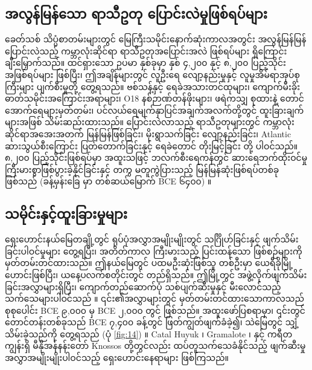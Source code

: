 \documentclass[10pt,twocolumn,letterpaper]{article}
\begin{document}
\subsection{အလွန်မြန်သော ရာသီဥတု ပြောင်းလဲမှုဖြစ်ရပ်များ}

ခေတ်သစ် သိပ္ပံစာတမ်းများတွင် မြေကြီးသမိုင်းနောက်ဆုံးကာလအတွင်း အလွန်မြန်မြန် ပြောင်းလဲသည့် ကမ္ဘာလုံးဆိုင်ရာ ရာသီဥတုအပြောင်းအလဲ ဖြစ်ရပ်များ ရှိကြောင်း ချီးမြှောက်သည်။ ထင်ရှားသော ဥပမာ နှစ်ခုမှာ နှစ် ၄,၂၀၀ နှင့် ၈,၂၀၀ ပြည့်သိုင်း အဖြစ်ရပ်များ ဖြစ်ပြီး၊ ဤအချိန်များတွင် လူဦးရေ လျော့နည်းမှုနှင့် လူမှုအိမ်ရာအုပ်စုကြီးများ ပျက်စီးမှုတို့ တွေ့ရသည်။ ဗစ်သန့်နှင့် ရေခဲအသားတင်ထုများ၊ ကျောက်မီးခိုးဓာတ်သမိုင်းအကြောင်းအရာများ၊ O18 နစ်ဉာဏ်တန်ဖိုးများ၊ ဖရဲကသျှ စုထားနဲ့ တောင်အောက်ရေများမှတ်တမ်း၊ ပင်လယ်ရေမျက်နှာပြင်အချက်အလက်တို့တွင် ထူးခြားချက်များအဖြစ် သိမ်းဆည်းထားသည်။ ပြောင်းလဲလာသည့် ရာသီဥတုများတွင် ကမ္ဘာလုံးဆိုင်ရာအအေးအတက် မြန်မြန်ဖြစ်ခြင်း၊ မိုးရွာသက်ခြင်း လျော့နည်းခြင်း၊ Atlantic ဆားသွယ်စီးကြောင်း ပြတ်တောက်ခြင်းနှင့် ရေခဲတောင် တိုးမြင့်ခြင်း \cite{90,91,92} တို့ ပါဝင်သည်။ ၈,၂၀၀ ပြည့်သိုင်းဖြစ်ရပ်မှာ အထူးသဖြင့် ဘလက်စီးရေကန်တွင် ဆားရေဘက်ထိုးဝင်မှု ကြီးမားစွာဖြစ်ပွားခဲ့နိုင်ခြင်းနှင့် တကွ မတူကွဲပြားသည့် မြန်မြန်ဆုံးဖြစ်ရပ်တစ်ခုဖြစ်သည် (ခန့်မှန်းခြေ မှာ တစ်ဆယ်မြောက် BCE ၆၄၀၀) \cite{93}။

\subsection{သမိုင်းနှင့်ထူးခြားမှုများ}

ရှေးဟောင်းနယ်မြေတချို့တွင် ရုပ်ပုံအလွှာအမျိုးမျိုးတွင် သင်္ဂြိုဟ်ခြင်းနှင့် ဖျက်သိမ်းခြင်းပါဝင်မှုများ တွေ့ရပြီး၊ အတိတ်ကာလ ကြီးမားသည့် ပြင်းထန်သော ဖြစ်စဉ်များကို မှတ်တမ်းတင်ထားသည်။ ဤနယ်မြေတွင် ပထမဦးဆုံးဖြစ်သူ တစ်ဦးမှာ ယေရီခိုမြို့ဟောင်းဖြစ်ပြီး၊ ယနေ့ပလက်စတိုင်းတွင် တည်ရှိသည်။ ဤမြို့တွင် အဖွဲ့လိုက်ဖျက်သိမ်းခြင်းအလွှာများရှိပြီး၊ ကျောက်တည်ဆောက်ပုံ သစ်ပျက်ဆီးမှုနှင့် မီးလောင်သည့်သက်သေများပါဝင်သည် \cite{96,97}။ ၎င်း၏အလွှာများတွင် မှတ်တမ်းတင်ထားသောကာလသည် စုစုပေါင်း BCE ၉,၀၀၀ မှ BCE ၂,၀၀၀ တွင် ဖြစ်သည်။ အထူးဖော်ပြစရာမှာ၊ ၎င်းတွင် တောင်တန်းတစ်ခုသည် BCE ၇,၄၀၀ ခန့်တွင် ဖြတ်ကျွတ်ဖျက်ခံခဲ့၍၊ သဲမြေတွင် သျှံ့သိမ်းခဲ့သည်ကို တွေ့ရသည် (ပုံ \ref{fig:14}) \cite{95}။ Catal Huyuk \cite{99}၊ Gramalote \cite{98}၊ နှင့် ကရီတကျွန်းရှိ မီနိုအန်နန်းတော် Knossos \cite{100,101} တို့တွင်လည်း ထပ်တူသက်သေခံနိုင်သည့် ဖျက်ဆီးမှုအလွှာအမျိုးမျိုးပါဝင်သည့် ရှေးဟောင်းနေရာများ ဖြစ်ကြသည်။
\end{document}
